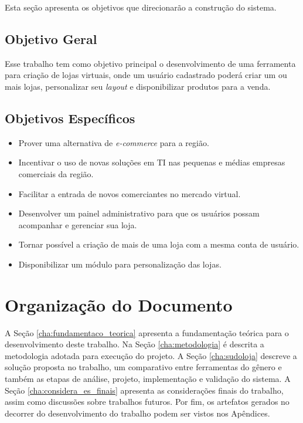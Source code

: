 \documentclass[a4paper,12pt]{monografia}
\begin{document}
Esta seção apresenta os objetivos que direcionarão a construção do sistema.

\subsection{Objetivo Geral} %
\label{sub:objetivo_geral}

Esse trabalho tem como objetivo principal o desenvolvimento de uma ferramenta para criação de lojas virtuais, onde um usuário cadastrado poderá criar um ou mais lojas, personalizar seu \textit{layout} e disponibilizar produtos para a venda.


\subsection{Objetivos Específicos} %
\label{sub:objetivos_espec}

\begin{itemize}
\item Prover uma alternativa de \textit{e-commerce} para a região.
\item Incentivar o uso de novas soluções em TI nas pequenas e médias empresas comerciais da região.
\item Facilitar a entrada de novos comerciantes no mercado virtual.
\item Desenvolver um painel administrativo para que os usuários possam acompanhar e gerenciar sua loja.
\item Tornar possível a criação de mais de uma loja com a mesma conta de usuário.
\item Disponibilizar um módulo para personalização das lojas.
\end{itemize}


\section{Organização do Documento} %
\label{sec:organizacao_do_documento}

A Seção \ref{cha:fundamentaco_teorica} apresenta a fundamentação teórica para o desenvolvimento deste trabalho. Na Seção \ref{cha:metodologia} é descrita a metodologia adotada para execução do projeto. A Seção \ref{cha:sudoloja} descreve a solução proposta no trabalho, um comparativo entre ferramentas do gênero e também as etapas de análise, projeto, implementação e validação do sistema. A Seção \ref{cha:considera_es_finais} apresenta as considerações finais do trabalho, assim como discussões sobre trabalhos futuros. Por fim, os artefatos gerados no decorrer do desenvolvimento do trabalho podem ser vistos nos Apêndices.
\end{document}

